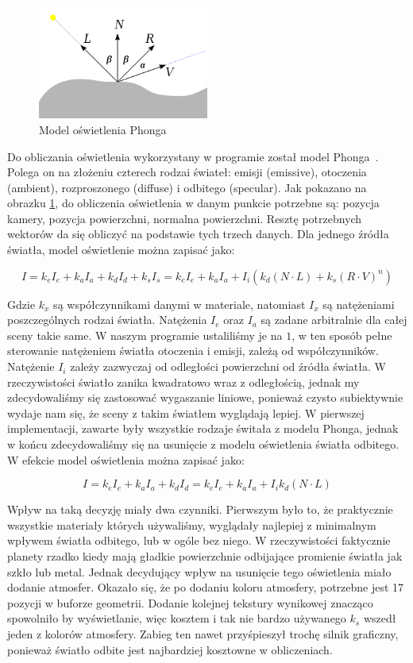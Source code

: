 \begin{figure}
\centering
	\includegraphics[width=0.5\textwidth]{img/phong.png}
\caption{Model oświetlenia Phonga}
\label{fig:phong}
\end{figure}

Do obliczania oświetlenia wykorzystany w programie został model Phonga~\cite{wiki:phong}. Polega on na złożeniu czterech rodzai świateł: emisji (emissive), otoczenia (ambient), rozproszonego (diffuse) i odbitego (specular). Jak pokazano na obrazku \hyperref[fig:phong]{\ref*{fig:phong}}, do obliczenia oświetlenia w danym punkcie potrzebne są: pozycja kamery, pozycja powierzchni, normalna powierzchni. Resztę potrzebnych wektorów da się obliczyć na podstawie tych trzech danych. Dla jednego źródła światła, model oświetlenie można zapisać jako:


$$ I = k_e I_e + k_a I_a + k_d I_d + k_s I_s = k_e I_e + k_a I_a + I_i( k_d( N \cdot L ) + k_s ( R \cdot V )^n ) $$

Gdzie $k_x$ są współczynnikami danymi w materiale, natomiast $I_x$ są natężeniami poszczególnych rodzai światła. Natężenia $I_e$ oraz $I_a$ są zadane arbitralnie dla całej sceny takie same. W naszym programie ustaliliśmy je na $1$, w ten sposób pełne sterowanie natężeniem światła otoczenia i emisji, zależą od współczynników. Natężenie $I_i$ zależy zazwyczaj od odległości powierzchni od źródła światła. W rzeczywistości światło zanika kwadratowo wraz z odległością, jednak my zdecydowaliśmy się zastosować wygaszanie liniowe, ponieważ czysto subiektywnie wydaje nam się, że sceny z takim światłem wyglądają lepiej. W pierwszej implementacji, zawarte były wszystkie rodzaje świtała z modelu Phonga, jednak w końcu zdecydowaliśmy się na usunięcie z modelu oświetlenia światła odbitego. W efekcie model oświetlenia można zapisać jako:

$$ I = k_e I_e + k_a I_a + k_d I_d = k_e I_e + k_a I_a + I_i k_d( N \cdot L ) $$

Wpływ na taką decyzję miały dwa czynniki. Pierwszym było to, że praktycznie wszystkie materiały których używaliśmy, wyglądały najlepiej z minimalnym wpływem światła odbitego, lub w ogóle bez niego. W rzeczywistości faktycznie planety rzadko kiedy mają gładkie powierzchnie odbijające promienie światła jak szkło lub metal. Jednak decydujący wpływ na usunięcie tego oświetlenia miało dodanie atmosfer. Okazało się, że po dodaniu koloru atmosfery, potrzebne jest 17 pozycji w buforze geometrii. Dodanie kolejnej tekstury wynikowej znacząco spowolniło by wyświetlanie, więc kosztem i tak nie bardzo używanego $k_s$ wszedł jeden z kolorów atmosfery. Zabieg ten nawet przyśpieszył trochę silnik graficzny, ponieważ światło odbite jest najbardziej kosztowne w obliczeniach.

